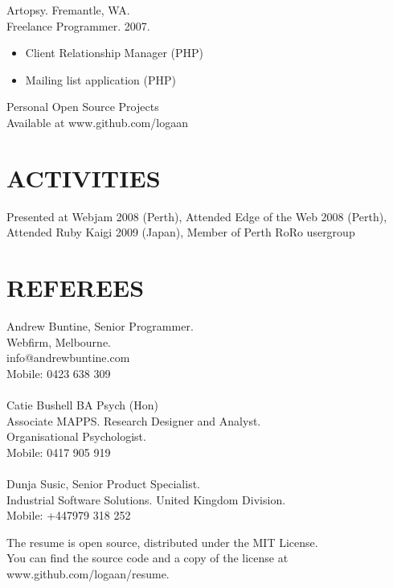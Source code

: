 \documentclass[margin]{res}
\begin{document}
\begin{resume}
   Artopsy. Fremantle, WA. \\
    Freelance Programmer. 2007.
 \begin{itemize}
  \item Client Relationship Manager (PHP)
  \item Mailing list application (PHP)
  \end{itemize} 

  Personal Open Source Projects \\
  Available at www.github.com/logaan

  \section{ACTIVITIES}
  Presented at Webjam 2008 (Perth), Attended Edge of the Web 2008 (Perth), Attended
  Ruby Kaigi 2009 (Japan), Member of Perth RoRo usergroup
  
  \section{REFEREES}
  Andrew Buntine, Senior Programmer. \\
  Webfirm, Melbourne. \\
  info@andrewbuntine.com \\
  Mobile: 0423 638 309 \\
  \\
  Catie Bushell BA Psych (Hon) \\
  Associate MAPPS. Research Designer and Analyst. \\
  Organisational Psychologist. \\
  Mobile: 0417 905 919 \\
  \\
  Dunja Susic, Senior Product Specialist. \\
  Industrial Software Solutions. United Kingdom Division. \\
  Mobile: +447979 318 252 \\
  
\end{resume} 

\centering
\hspace{-1.75in}  The resume is open source, distributed under the MIT License. \\
\hspace{-1.75in}  You can find the source code and a copy of the license at www.github.com/logaan/resume.
\end{document}
